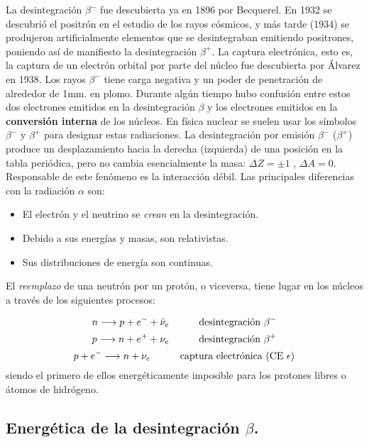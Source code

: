 La desintegración $\beta^-$ fue descubierta ya en 1896 por Becquerel. En 1932 se descubrió el positrón en el estudio de los rayos cósmicos, y más tarde (1934) se produjeron artificialmente elementos que se desintegraban emitiendo positrones, poniendo así de manifiesto la desintegración $\beta^+$. La captura electrónica, esto es, la captura de un electrón orbital por parte del núcleo fue descubierta por Álvarez en 1938. Los rayos $\beta^-$ tiene carga negativa y un poder de penetración de alrededor de 1mm. en plomo. Durante algún tiempo hubo confusión entre estos dos electrones emitidos en la desintegración $\beta$ y los electrones emitidos en la \textbf{conversión interna} de los núcleos. En física nuclear se suelen usar los símbolos $\beta^-$ y $\beta^+$ para designar estas radiaciones. La desintegración por emisión $\beta^-$ ($\beta^+$) produce un desplazamiento hacia la derecha (izquierda) de una posición en la tabla periódica, pero no cambia esencialmente la masa: $\Delta Z= \pm 1$ , $\Delta A = 0$. Responsable de este fenómeno es la interacción débil. Las principales diferencias con la radiación $\alpha$ son:

\begin{itemize}
	\item El electrón y el neutrino se \textit{crean} en la desintegración.
	\item Debido a sus energías y masas, son relativistas.
	\item Sus distribuciones de energía son continuas.
\end{itemize}	

El \textit{reemplazo} de una neutrón por un protón, o viceversa, tiene lugar en los núcleos a través de los siguientes procesos:

\begin{equation}
	n \longrightarrow p + e^- + \bar{\nu}_e  \quad \quad \quad \text{desintegración} \ \beta^-
\end{equation}
\begin{equation}
	p \longrightarrow n + e^+ + {\nu}_e \quad \quad \quad \text{desintegración} \ \beta^+
\end{equation}
\begin{equation}
	p + e^- \longrightarrow n + {\nu}_e \quad \quad \quad \text{captura electrónica (CE} \ \epsilon)
\end{equation}
siendo el primero de ellos energéticamente imposible para los protones libres o átomos de hidrógeno. 

\subsection{Energética de la desintegración $\beta$.}

